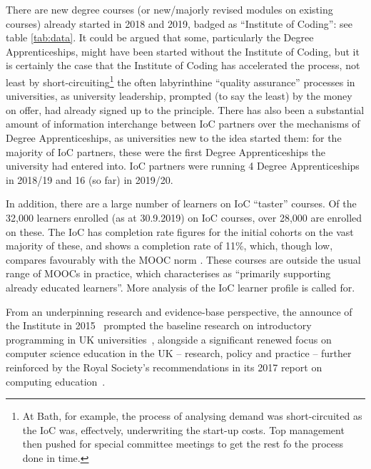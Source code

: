 \documentclass[conference]{IEEEtran}
\begin{document}
There are new degree courses (or new/majorly revised modules on existing courses) already started in 2018 and 2019,
badged as ``Institute of Coding'': see table \ref{tab:data}.
It could be argued that some, particularly the
Degree Apprenticeships, might have been started without the Institute
of Coding, but it is certainly the case that the Institute of Coding
has accelerated the process, not least by short-circuiting\footnote{At Bath, for example, the process of analysing demand was short-circuited as the IoC was, effectvely, underwriting the start-up costs. Top management then pushed for special committee meetings to get the rest fo the process done in time.} the often
labyrinthine ``quality assurance'' processes in universities, as
university leadership, prompted (to say the least) by the money on
offer, had already signed up to the principle. There has also been a substantial amount of information interchange between IoC partners over the mechanisms of Degree Apprenticeships, as universities new to the idea started them: for the majority of IoC partners, these were the first Degree Apprenticeships the university had entered into. IoC partners were running 4 Degree Apprenticeships in 2018/19 and 16 (so far) in 2019/20.

In addition, there are a large number of learners on IoC ``taster'' courses. Of the 32,000 learners enrolled (as at 30.9.2019) on IoC courses, over 28,000 are enrolled on these.  The IoC has completion rate figures for the initial cohorts on the vast majority of these, and shows a completion rate of 11\%, which, though low, compares favourably with the MOOC norm \cite{ReichRuiperezValiente2019a}. These courses are outside the usual range of MOOCs in practice, which \cite{ReichRuiperezValiente2019a} characterises as ``primarily supporting already educated learners''.  More analysis of the IoC learner profile is called for.

From an underpinning research and evidence-base perspective, the
announce of the Institute in 2015~\cite{HMG2015a} prompted the
baseline research on introductory programming in UK
universities~\cite{murphy-et-al:programming2017,simon-et-al:sigcse2018},
alongside a significant renewed focus on computer science education in
the UK -- research, policy and practice -- further reinforced by the
Royal Society's recommendations in its 2017 report on computing
education~\cite{rs:2017}.

\end{document}

